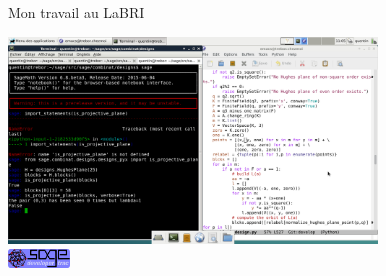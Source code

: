 \documentclass[10pt]{beamer}
\theoremstyle{definition}
\begin{document}
\begin{frame}
  {\Huge Mon travail au LaBRI}
  \begin{center}
   \includegraphics[height=5.5cm]{ecran.jpg}\bigskip\\

\href{trac.html}{\includegraphics[height=0.5cm]{sagetrac.png}}
  \end{center}
  \end{frame}  
\end{document}
